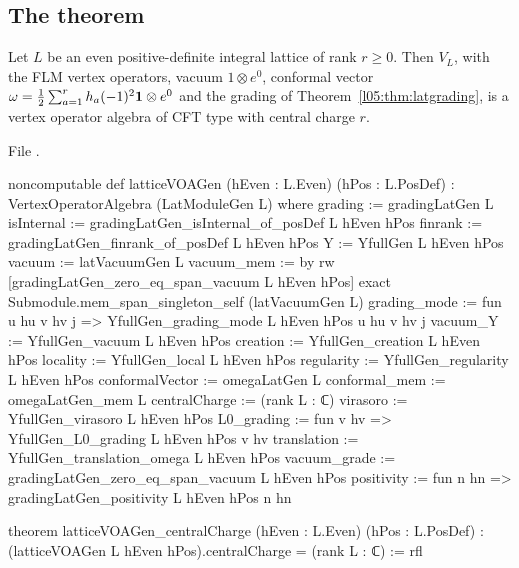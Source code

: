 \subsection{The theorem}

\begin{theorem}\label{l05:thm:latticeVOAGen}
Let $L$ be an even positive-definite integral lattice of rank $r\ge0$. Then $V_L$, with the FLM vertex
operators, vacuum $1\otimes e^0$, conformal vector $\omega=\frac12\sum_{a=1}^rh_a(-1)^2\mathbf{1}\otimes e^0$ and the
grading of Theorem~\ref{l05:thm:latgrading}, is a vertex operator algebra of CFT type with central charge $r$.
\end{theorem}

\noindent File .
\begin{leancode}
noncomputable def latticeVOAGen (hEven : L.Even) (hPos : L.PosDef) :
    VertexOperatorAlgebra (LatModuleGen L) where
  grading := gradingLatGen L
  isInternal := gradingLatGen_isInternal_of_posDef L hEven hPos
  finrank := gradingLatGen_finrank_of_posDef L hEven hPos
  Y := YfullGen L hEven hPos
  vacuum := latVacuumGen L
  vacuum_mem := by
    rw [gradingLatGen_zero_eq_span_vacuum L hEven hPos]
    exact Submodule.mem_span_singleton_self (latVacuumGen L)
  grading_mode := fun u hu v hv j => YfullGen_grading_mode L hEven hPos u hu v hv j
  vacuum_Y := YfullGen_vacuum L hEven hPos
  creation := YfullGen_creation L hEven hPos
  locality := YfullGen_local L hEven hPos
  regularity := YfullGen_regularity L hEven hPos
  conformalVector := omegaLatGen L
  conformal_mem := omegaLatGen_mem L
  centralCharge := (rank L : ℂ)
  virasoro := YfullGen_virasoro L hEven hPos
  L0_grading := fun v hv => YfullGen_L0_grading L hEven hPos v hv
  translation := YfullGen_translation_omega L hEven hPos
  vacuum_grade := gradingLatGen_zero_eq_span_vacuum L hEven hPos
  positivity := fun n hn => gradingLatGen_positivity L hEven hPos n hn

theorem latticeVOAGen_centralCharge (hEven : L.Even) (hPos : L.PosDef) :
    (latticeVOAGen L hEven hPos).centralCharge = (rank L : ℂ) := rfl
\end{leancode}

